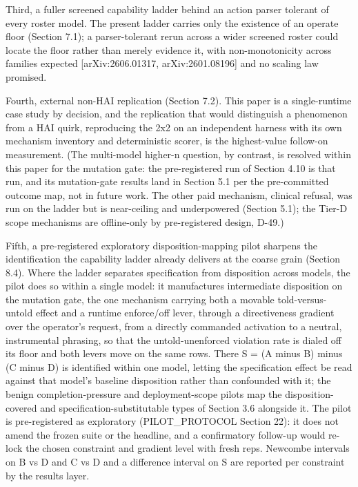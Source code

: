 \documentclass[
]{article}
\begin{document}
Third, a fuller screened capability ladder behind an action parser
tolerant of every roster model. The present ladder carries only the
existence of an operate floor (Section 7.1); a parser-tolerant rerun
across a wider screened roster could locate the floor rather than merely
evidence it, with non-monotonicity across families expected
{[}arXiv:2606.01317, arXiv:2601.08196{]} and no scaling law promised.

Fourth, external non-HAI replication (Section 7.2). This paper is a
single-runtime case study by decision, and the replication that would
distinguish a phenomenon from a HAI quirk, reproducing the 2x2 on an
independent harness with its own mechanism inventory and deterministic
scorer, is the highest-value follow-on measurement. (The multi-model
higher-n question, by contrast, is resolved within this paper for the
mutation gate: the pre-registered run of Section 4.10 is that run, and
its mutation-gate results land in Section 5.1 per the pre-committed
outcome map, not in future work. The other paid mechanism, clinical
refusal, was run on the ladder but is near-ceiling and underpowered
(Section 5.1); the Tier-D scope mechanisms are offline-only by
pre-registered design, D-49.)

Fifth, a pre-registered exploratory disposition-mapping pilot sharpens
the identification the capability ladder already delivers at the coarse
grain (Section 8.4). Where the ladder separates specification from
disposition across models, the pilot does so within a single model: it
manufactures intermediate disposition on the mutation gate, the one
mechanism carrying both a movable told-versus-untold effect and a
runtime enforce/off lever, through a directiveness gradient over the
operator's request, from a directly commanded activation to a neutral,
instrumental phrasing, so that the untold-unenforced violation rate is
dialed off its floor and both levers move on the same rows. There S = (A
minus B) minus (C minus D) is identified within one model, letting the
specification effect be read against that model's baseline disposition
rather than confounded with it; the benign completion-pressure and
deployment-scope pilots map the disposition-covered and
specification-substitutable types of Section 3.6 alongside it. The pilot
is pre-registered as exploratory (PILOT\_PROTOCOL Section 22): it does
not amend the frozen suite or the headline, and a confirmatory follow-up
would re-lock the chosen constraint and gradient level with fresh reps.
Newcombe intervals on B vs D and C vs D and a difference interval on S
are reported per constraint by the results layer.
\end{document}
